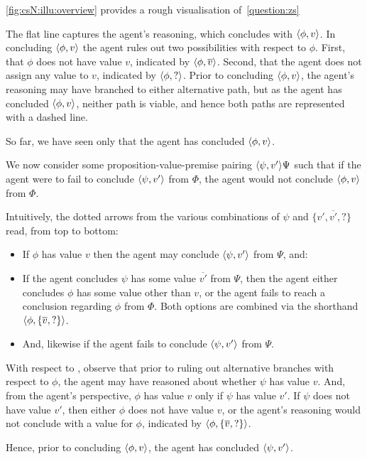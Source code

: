 \begin{note}[Figure]
  \autoref{fig:csN:illu:overview} provides a rough visualisation of~\autoref{question:zs}

  The flat line captures the agent's reasoning, which concludes with \(\langle \phi, v \rangle\).
  In concluding \(\langle \phi, v \rangle\) the agent rules out two possibilities with respect to \(\phi\).
  First, that \(\phi\) does not have value \(v\), indicated by \(\langle \phi, \overline{v} \rangle\).
  Second, that the agent does not assign any value to \(v\), indicated by \(\langle \phi, ? \rangle\).
  Prior to concluding \(\langle \phi, v \rangle\), the agent's reasoning may have branched to either alternative path, but as the agent has concluded \(\langle \phi, v \rangle\), neither path is viable, and hence both paths are represented with a dashed line.

  So far, we have seen only that the agent has concluded \(\langle \phi, v \rangle\).

  We now consider some proposition-value-premise pairing \(\langle \psi, v' \rangle{\Psi}\) such that if the agent were to fail to conclude \(\langle \psi, v' \rangle\) from \(\Phi\), the agent would not conclude \(\langle \phi, v \rangle\) from \(\Phi\).

  Intuitively, the dotted arrows from the various combinations of \(\psi\) and \(\{v',\overline{v'},?\}\) read, from top to bottom:
  \begin{itemize}
  \item If \(\phi\) has value \(v\) then the agent may conclude \(\langle \psi, v' \rangle\) from \(\Psi\), and:
  \item If the agent concludes \(\psi\) has some value \(\overline{v'}\) from \(\Psi\), then the agent either concludes \(\phi\) has some value other than \(v\), or the agent fails to reach a conclusion regarding \(\phi\) from \(\Phi\).
    Both options are combined via the shorthand \(\langle \phi, \{\overline{v},?\} \rangle\).
  \item
    And, likewise if the agent fails to conclude \(\langle \psi, v' \rangle\) from \(\Psi\).
  \end{itemize}

  With respect to \csN{}, observe that prior to ruling out alternative branches with respect to \(\phi\), the agent may have reasoned about whether \(\psi\) has value \(v\).
  And, from the agent's perspective, \(\phi\) has value \(v\) only if \(\psi\) has value \(v'\).
  If \(\psi\) does not have value \(v'\), then either \(\phi\) does not have value \(v\), or the agent's reasoning would not conclude with a value for \(\phi\), indicated by \(\langle \phi, \{\overline{v},?\} \rangle\).

  Hence, prior to concluding \(\langle \phi, v \rangle\), the agent has concluded \(\langle \psi, v' \rangle\).
\end{note}

